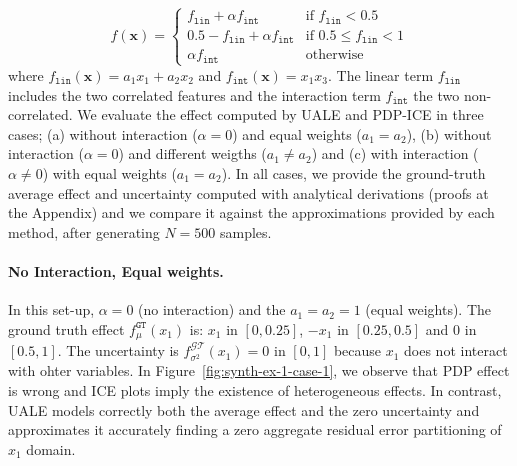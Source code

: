 \documentclass[twoside]{article}
\begin{document}
\begin{equation}
  \label{eq:synth-ex-1-function}
  f(\mathbf{x}) = \begin{cases}
                    f_{\mathtt{lin}} + \alpha f_{\mathtt{int}} & \text{if $f_{\mathtt{lin}} < 0.5$ }\\
                    0.5 - f_{\mathtt{lin}} + \alpha f_{\mathtt{int}} & \text{if $0.5 \leq f_{\mathtt{lin}} < 1$}\\
                    \alpha f_{\mathtt{int}} &\text{otherwise}
                  \end{cases}
\end{equation}
%
where \(f_{\mathtt{lin}}(\mathbf{x}) = a_1 x_1 + a_2 x_2\) and
\(f_{\mathtt{int}}(\mathbf{x}) = x_1x_3\). The linear term
\(f_{\mathtt{lin}}\) includes the two correlated features and the
interaction term \(f_{\mathtt{int}}\) the two non-correlated.  We
evaluate the effect computed by UALE and PDP-ICE in three cases; (a)
without interaction (\(\alpha=0\)) and equal weights (\(a_1=a_2\)),
(b) without interaction (\(\alpha=0\)) and different weigths
(\( a_1 \neq a_2 \)) and (c) with interaction (\(\alpha \neq 0\)) with
equal weights (\(a_1=a_2\)). In all cases, we provide the ground-truth
average effect and uncertainty computed with analytical derivations
(proofs at the Appendix) and we compare it against the approximations
provided by each method, after generating \(N=500\) samples.

\paragraph{No Interaction, Equal weights.}

In this set-up, \(\alpha=0\) (no interaction) and the \(a_1=a_2=1\)
(equal weights). The ground truth effect \(f_\mu^{\mathtt{GT}}(x_1)\)
is: \(x_1\) in \([0, 0.25]\), \(-x_1\) in \([0.25, 0.5]\) and \(0\) in
\([0.5, 1]\). The uncertainty is
\(f^{\mathcal{GT}}_{\sigma^2}(x_1) = 0\) in \([0,1]\) because \(x_1\)
does not interact with ohter variables. In
Figure~\ref{fig:synth-ex-1-case-1}, we observe that PDP effect is
wrong and ICE plots imply the existence of heterogeneous effects. In
contrast, UALE models correctly both the average effect and the zero
uncertainty and approximates it accurately finding a zero aggregate
residual error partitioning of \(x_1\) domain.
\end{document}
